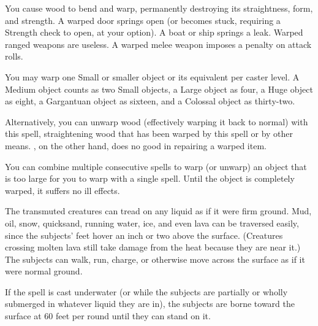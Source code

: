 \spellrng{\rngclose}
\begin{spelleffect}
  You cause wood to bend and warp, permanently destroying its straightness, form, and strength. A warped door springs open (or becomes stuck, requiring a Strength check to open, at your option). A boat or ship springs a leak. Warped ranged weapons are useless. A warped melee weapon imposes a  penalty on attack rolls.
  \par You may warp one Small or smaller object or its equivalent per caster level. A Medium object counts as two Small objects, a Large object as four, a Huge object as eight, a Gargantuan object as sixteen, and a Colossal object as thirty-two.
  \par Alternatively, you can unwarp wood (effectively warping it back to normal) with this spell, straightening wood that has been warped by this spell or by other means. , on the other hand, does no good in repairing a warped item.
\end{spelleffect}
\begin{spellnotes}
  You can combine multiple consecutive  spells to warp (or unwarp) an object that is too large for you to warp with a single spell. Until the object is completely warped, it suffers no ill effects.
\end{spellnotes}

\begin{spelleffect}
  The transmuted creatures can tread on any liquid as if it were firm ground. Mud, oil, snow, quicksand, running water, ice, and even lava can be traversed easily, since the subjects' feet hover an inch or two above the surface. (Creatures crossing molten lava still take damage from the heat because they are near it.) The subjects can walk, run, charge, or otherwise move across the surface as if it were normal ground.
  \par If the spell is cast underwater (or while the subjects are partially or wholly submerged in whatever liquid they are in), the subjects are borne toward the surface at 60 feet per round until they can stand on it.
\end{spelleffect}

